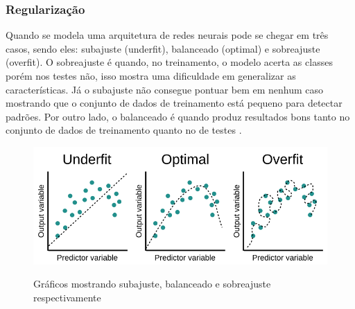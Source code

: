 \subsubsection*{Regularização}

Quando se modela uma arquitetura de redes neurais pode se chegar em três casos, sendo eles: subajuste (underfit), balanceado (optimal) e sobreajuste (overfit). O sobreajuste é quando, no treinamento, o modelo acerta as classes porém nos testes não, isso mostra uma dificuldade em generalizar as características. Já o subajuste não consegue pontuar bem em nenhum caso mostrando que o conjunto de dados de treinamento está pequeno para detectar padrões. Por outro lado,  o balanceado é quando produz resultados bons tanto no conjunto de dados de treinamento quanto no de testes \space\cite{Alzubaidi2021, computation11030052}.

\begin{figure}[ht]
	\caption{Gráficos mostrando subajuste, balanceado e sobreajuste respectivamente} 
	\centering %
	\includegraphics[width=15cm]{figures/fittings.png} %
	\label{fig:fittings}
\end{figure}
